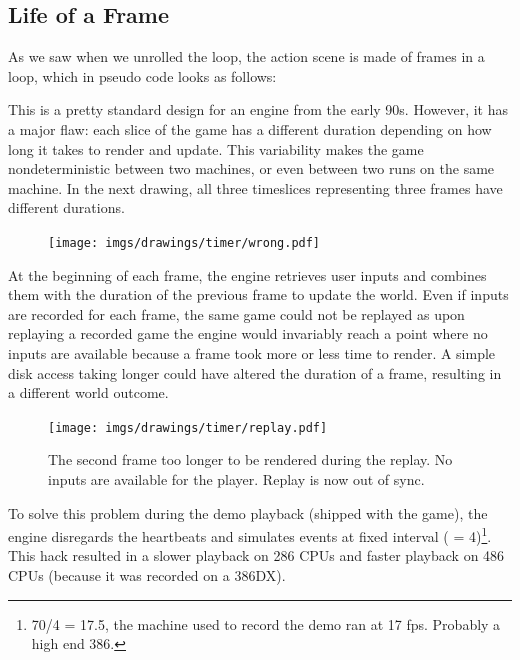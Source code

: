 \subsection{Life of a Frame}
As we saw when we unrolled the loop, the action scene is made of frames in a loop, which in pseudo code looks as follows:\\
\par
\begin{minipage}{\textwidth}
 
 \end{minipage}
\par
This is a pretty standard design for an engine from the early 90s. However, it has a major flaw: each slice of the game has a different duration depending on how long it takes to render and update. This variability makes the game nondeterministic between two machines, or even between two runs on the same machine. In the next drawing, all three timeslices representing three frames have different durations.\\
\begin{figure}[H]
\centering
 \texttt{[image: imgs/drawings/timer/wrong.pdf]}
 
 \end{figure}
  At the beginning of each frame, the engine retrieves user inputs and combines them with the duration of the previous frame to update the world. Even if inputs are recorded for each frame, the same game could not be replayed as upon replaying a recorded game the engine would invariably reach a point where no inputs are available because a frame took more or less time to render. A simple disk access taking longer could have altered the duration of a frame, resulting in a different world outcome.\\
 \begin{figure}[H]
\centering
 \texttt{[image: imgs/drawings/timer/replay.pdf]}
 \caption{The second frame too longer to be rendered during the replay. No inputs are available for the player. Replay is now out of sync.}
 \end{figure}
\par
To solve this problem during the demo playback (shipped with the game), the engine disregards the heartbeats and simulates events at fixed interval ( = 4)\footnote{70/4 = 17.5, the machine used to record the demo ran at 17 fps. Probably a high end 386.}. This hack resulted in a slower playback on 286 CPUs and faster playback on 486 CPUs (because it was recorded on a 386DX).\\
